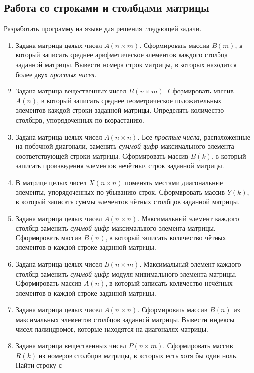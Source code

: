 \subsection[Работа со строками и столбцами матрицы]{Работа со строками и столбцами матрицы}
Разработать программу на языке  для решения следующей задачи.

\begin{enumerate}
\item Задана матрица целых чисел $A(n\times m)$. Сформировать массив
$B(m)$, в который записать среднее арифметическое элементов каждого столбца заданной матрицы.
Вывести номера строк матрицы, в которых находится более двух \emph{простых чисел}.
\item Задана матрица вещественных чисел $B(n\times m)$. Сформировать массив
$A(n)$, в который записать среднее геометрическое положительных элементов каждой строки
заданной матрицы. Определить количество столбцов, упорядоченных по возрастанию.
\item Задана матрица целых чисел $A(n\times n)$. Все \emph{простые числа}, расположенные на
побочной диагонали, заменить \emph{суммой цифр} максимального элемента соответствующей строки матрицы. Сформировать
массив $B(k)$, в который записать произведения элементов нечётных строк заданной матрицы.
\item В матрице целых чисел $X(n\times n)$ поменять местами диагональные элементы,  упорядоченных по
убыванию строк. Сформировать массив $Y(k)$, в который записать суммы элементов чётных
столбцов заданной матрицы.
\item Задана матрица целых чисел $A(n\times n)$. Максимальный элемент каждого столбца заменить
\emph{суммой цифр} максимального элемента матрицы. Сформировать массив $B(n)$, в который
записать количество чётных элементов в каждой строке заданной матрицы. 
\item Задана матрица целых чисел $B(n\times m)$. Максимальный элемент каждого столбца
заменить \emph{суммой цифр} модуля минимального элемента матрицы. Сформировать массив
$A(n)$, в который записать количество нечётных элементов в каждой строке заданной матрицы.
\item Задана матрица целых чисел $A(n\times n)$. Сформировать массив $B(n)$
из максимальных элементов столбцов заданной матрицы. Вывести индексы 
чисел-палиндромов, которые находятся на диагоналях матрицы. 
\item Задана матрица вещественных чисел $P(n\times m)$. Сформировать массив
$R(k)$ из номеров столбцов матрицы, в которых есть хотя бы один ноль. Найти строку с

\end{enumerate}
